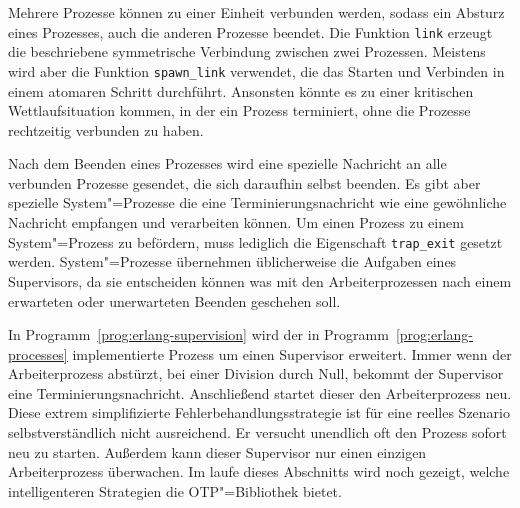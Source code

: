 Mehrere Prozesse können zu einer Einheit verbunden werden, sodass ein Absturz eines Prozesses, auch die anderen Prozesse beendet. Die Funktion \lstinline{link} erzeugt die beschriebene symmetrische Verbindung zwischen zwei Prozessen. Meistens wird aber die Funktion \lstinline{spawn_link} verwendet, die das Starten und Verbinden in einem atomaren Schritt durchführt. Ansonsten könnte es zu einer kritischen Wettlaufsituation kommen, in der ein Prozess terminiert, ohne die Prozesse rechtzeitig verbunden zu haben.

Nach dem Beenden eines Prozesses wird eine spezielle Nachricht an alle verbunden Prozesse gesendet, die sich daraufhin selbst beenden. Es gibt aber spezielle System"=Prozesse die eine Terminierungsnachricht wie eine gewöhnliche Nachricht empfangen und verarbeiten können. Um einen Prozess zu einem System"=Prozess zu befördern, muss lediglich die Eigenschaft \lstinline{trap_exit} gesetzt werden. System"=Prozesse übernehmen üblicherweise die Aufgaben eines Supervisors, da sie entscheiden können was mit den Arbeiterprozessen nach einem erwarteten oder unerwarteten Beenden geschehen soll.

In Programm~\ref{prog:erlang-supervision} wird der in Programm~\ref{prog:erlang-processes} implementierte Prozess um einen Supervisor erweitert. Immer wenn der Arbeiterprozess abstürzt, \zB bei einer Division durch Null, bekommt der Supervisor eine Terminierungsnachricht. Anschließend startet dieser den Arbeiterprozess neu. Diese extrem simplifizierte Fehlerbehandlungsstrategie ist für eine reelles Szenario selbstverständlich nicht ausreichend. Er versucht unendlich oft den Prozess sofort neu zu starten. Außerdem kann dieser Supervisor nur einen einzigen Arbeiterprozess überwachen. Im laufe dieses Abschnitts wird noch gezeigt, welche intelligenteren Strategien die OTP"=Bibliothek bietet.

